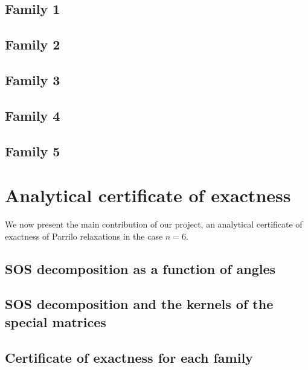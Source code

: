 \documentclass[onecolumn,11pt,a4paper]{article}
\theoremstyle{plain}  %
\theoremstyle{remark}  %
\begin{document}
\subsection{Family 1}
\label{sub:fam-1}
\subsection{Family 2}
\label{sub:fam-2}
\subsection{Family 3}
\label{sub:fam-3}
\subsection{Family 4}
\label{sub:fam-4}
\subsection{Family 5}
\label{sub:fam-5}
\section{Analytical certificate of exactness}
\label{sec:analytical}
We now present the main contribution of our project, an analytical certificate of exactness of Parrilo relaxations in the case $n = 6$.
\subsection{SOS decomposition as a function of angles}
\label{sub:sos-angles}
\subsection{SOS decomposition and the kernels of the special matrices}
\label{sub:sos-kernel}
\subsection{Certificate of exactness for each family}
\label{sub:final-result}
\end{document}
